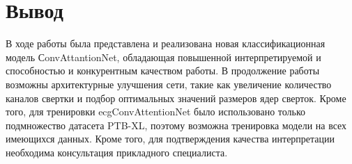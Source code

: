 \documentclass[oneside,final,14pt]{extreport}
\begin{document}
\chapter{Вывод}
В ходе работы была представлена и реализована новая классификационная модель СonvAttantionNet, обладающая повышенной интерпретируемой и способностью и конкурентным качеством работы. В продолжение работы возможны архитектурные улучшения сети, такие как увеличение количество каналов свертки и подбор оптимальных значений размеров ядер сверток. Кроме того, для тренировки ecgConvAttentionNet было использовано только подмножество датасета PTB-XL, поэтому возможна тренировка модели на всех имеющихся данных. Кроме того, для подтверждения качества интерпретации необходима консультация прикладного специалиста. 

\newpage
\end{document}
